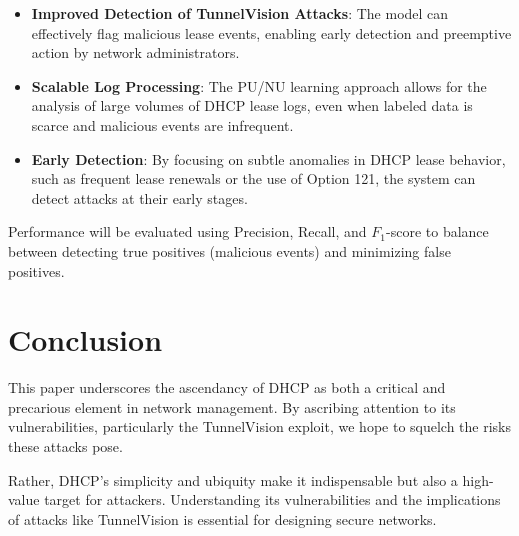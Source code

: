 \documentclass[conference]{IEEEtran}
\begin{document}
            \begin{itemize}
                \item \textbf{Improved Detection of TunnelVision Attacks}: The model can effectively flag malicious lease events, enabling early detection and preemptive action by network administrators.
                \item \textbf{Scalable Log Processing}: The PU/NU learning approach allows for the analysis of large volumes of DHCP lease logs, even when labeled data is scarce and malicious events are infrequent.
                \item \textbf{Early Detection}: By focusing on subtle anomalies in DHCP lease behavior, such as frequent lease renewals or the use of Option 121, the system can detect attacks at their early stages.
            \end{itemize}
            
            Performance will be evaluated using Precision, Recall, and \(F_{1}\)-score to balance between detecting true positives (malicious events) and minimizing false positives.
    
\section{Conclusion}
\label{sec:Conclusion}

    This paper underscores the ascendancy of DHCP as both a critical and precarious element in network management. By ascribing attention to its vulnerabilities, particularly the TunnelVision exploit, we hope to squelch the risks these attacks pose. 

    Rather, DHCP's simplicity and ubiquity make it indispensable but also a high-value target for attackers. Understanding its vulnerabilities and the implications of attacks like TunnelVision is essential for designing secure networks.



\end{document}

